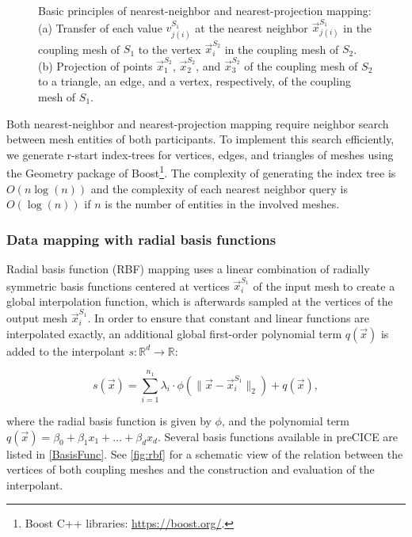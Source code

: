 \begin{figure}[h!]
{
  }
  \caption{\label{fig:nn_np}Basic principles of nearest-neighbor and nearest-projection mapping: (a) Transfer of each value $v_{j(i)}^{S_1}$ at the nearest neighbor $\vec{x}_{j(i)}^{S_1}$ in the coupling mesh of $S_1$ to the vertex $\vec{x}_i^{S_2}$ in the coupling mesh of $S_2$. (b) Projection of points $\vec{x}_1^{S_2}$, $\vec{x}_2^{S_2}$, and $\vec{x}_3^{S_2}$ of the coupling mesh of $S_2$ to a triangle, an edge, and a vertex, respectively, of the coupling mesh of $S_1$.}
\end{figure}  

Both nearest-neighbor and nearest-projection mapping require neighbor search between mesh entities of both participants. 
To implement this search efficiently, we generate r-start index-trees for vertices, edges, and triangles of meshes using the Geometry package of Boost\footnote{Boost C++ libraries: \url{https://boost.org/}.}.
The complexity of generating the index tree is $O(n \log(n))$ and the complexity of each nearest neighbor query is $O(\log(n))$ if $n$ is the number of entities in the involved meshes. 

\subsubsection{Data mapping with radial basis functions}

Radial basis function (RBF) mapping uses a linear combination of radially symmetric basis functions centered at vertices $\vec{x}^{S_1}_{i}$ of the input mesh to create a global interpolation function, which is afterwards sampled at the vertices of the output mesh $\vec{x}^{S_1}_{i}$. In order to ensure that constant and linear functions are interpolated exactly, an additional global first-order polynomial term $q(\vec{x})$ is added to the interpolant $s : \mathbb{R}^{d} \rightarrow \mathbb{R}$:

\begin{equation*}
s \left( \vec{x} \right) = \sum\limits_{i=1}^{n_1} \lambda_{i} \cdot \phi \left( \| \vec{x} - \vec{x}^{S_1}_{i} \| _{2}\right) + q \left( \vec{x} \right) ,
\end{equation*}

where the radial basis function is given by $\phi$, and the polynomial term $q \left( \vec{x} \right) = \beta_{0} + \beta_{1} x_{1} + \ldots + \beta_{d} x_{d}$.
Several basis functions available in preCICE are listed in \autoref{BasisFunc}.
See \autoref{fig:rbf} for a schematic view of the relation between the vertices of both coupling meshes and the construction and evaluation of the interpolant.

